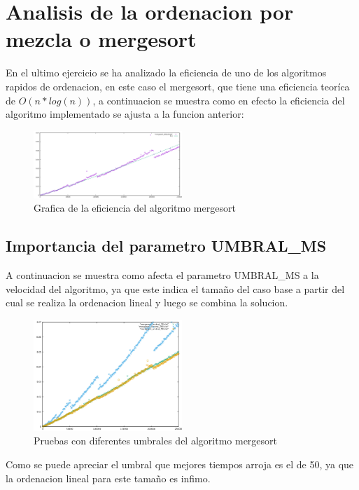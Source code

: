 \section{Analisis de la ordenacion por mezcla o mergesort}

En el ultimo ejercicio se ha analizado la eficiencia de uno de los algoritmos rapidos de ordenacion, en este caso el mergesort, que tiene una eficiencia teoríca de $O(n*log(n))$, a continuacion se muestra como en efecto la eficiencia del algoritmo implementado se ajusta a la funcion anterior:

\begin{figure}[ht]
  \centering
  \includegraphics[width=0.5\textwidth]{./Imagenes/mergesort_fit.png}
  \caption{Grafica de la eficiencia del algoritmo mergesort}
\end{figure}

\subsection{Importancia del parametro UMBRAL\_MS}

A continuacion se muestra como afecta el parametro UMBRAL\_MS a la velocidad del algoritmo, ya que este indica el tamaño del caso base a partir del cual se realiza la ordenacion lineal y luego se combina la solucion.

\begin{figure}[H]
  \centering
  \includegraphics[width=0.5\textwidth]{./Imagenes/mergesort_umbral.png}
  \caption{Pruebas con diferentes umbrales del algoritmo mergesort}
\end{figure}

Como se puede apreciar el umbral que mejores tiempos arroja es el de 50, ya que la ordenacion lineal para este tamaño es infimo.